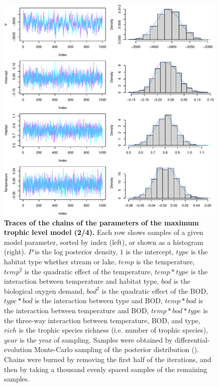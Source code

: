 \documentclass[11pt, oneside]{article}
\begin{document}
\begin{figure}[H]
\begin{center}
\includegraphics[page=2, width=1\linewidth]{b0_6_3/out_mTL/fig_tracePlot_beta.pdf}
\caption{
    \textbf{Traces of the chains of the parameters of the maximum trophic level model (2/4).}
    Each row shows samples of a given model parameter, sorted by index (left), or shown as a histogram (right).
    $P$ is the log posterior density, $1$ is the intercept, $type$ is the habitat type whether stream or lake, $temp$ is the temperature, $temp^2$ is the quadratic effect of the temperature, $temp * type$ is the interaction between temperature and habitat type, $bod$ is the biological oxygen demand, $bod^2$ is the quadratic effect of the BOD, $type * bod$ is the interaction between type and BOD, $temp * bod$ is the interaction between temperature and BOD, $temp * bod * type$ is the three-way interaction between temperature, BOD, and type, $rich$ is the trophic species richness (i.e. number of trophic species), $year$ is the year of sampling.
    Samples were obtained by differential-evolution Monte-Carlo sampling of the posterior distribution (\cite{TerBraak2006}).
    Chains were burned by removing the first half of the iterations, and then by taking a thousand evenly spaced samples of the remaining samples.
}
\end{center}
\end{figure}
\end{document}
